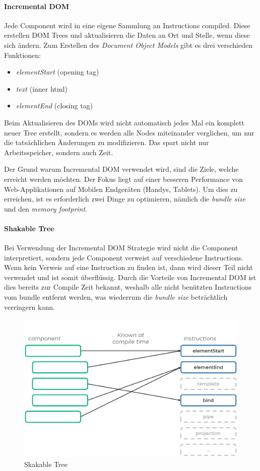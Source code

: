 \paragraph{Incremental DOM}
Jede Component wird in eine eigene Sammlung an Instructions compiled.
Diese erstellen DOM Trees und aktualisieren die Daten an Ort und Stelle, wenn diese sich ändern.
Zum Erstellen des \emph{Document Object Models} gibt es drei verschieden Funktionen:

\begin{itemize}
    \item \emph{elementStart} (opening tag)
    \item \emph{text} (inner html)
    \item \emph{elementEnd} (closing tag)
\end{itemize}

Beim Aktualisieren des DOMs wird nicht automatisch jedes Mal ein komplett neuer Tree erstellt, sondern es werden alle
Nodes miteinander verglichen, um nur die tatsächlichen Änderungen zu modifizieren.
Das spart nicht nur Arbeitsspeicher, sondern auch Zeit.

Der Grund warum Incremental DOM verwendet wird, sind die Ziele, welche erreicht werden möchten.
Der Fokus liegt auf einer besseren Performance von Web-Applikationen auf Mobilen Endgeräten (Handys, Tablets).
Um dies zu erreichen, ist es erforderlich zwei Dinge zu optimieren, nämlich die \emph{bundle size} und den \emph{memory footprint}.


\paragraph{Shakable Tree}
Bei Verwendung der Incremental DOM Strategie wird nicht die Component interpretiert, sondern jede Component verweist auf
verschiedene Instructions.
Wenn kein Verweis auf eine Instruction zu finden ist, dann wird dieser Teil nicht verwendet und ist somit überflüssig.
Durch die Vorteile von Incremental DOM ist dies bereits zur Compile Zeit bekannt, weshalb alle nicht benützten Instructions
vom bundle entfernt werden, was wiederrum die \emph{bundle size} beträchtlich verringern kann.

\begin{figure}[hbt!]
    \centering
    \includegraphics[scale=.6]{pics/shakable-tree}
    \caption{Skakable Tree}
    \label{fig:shakable-tree}
\end{figure}

